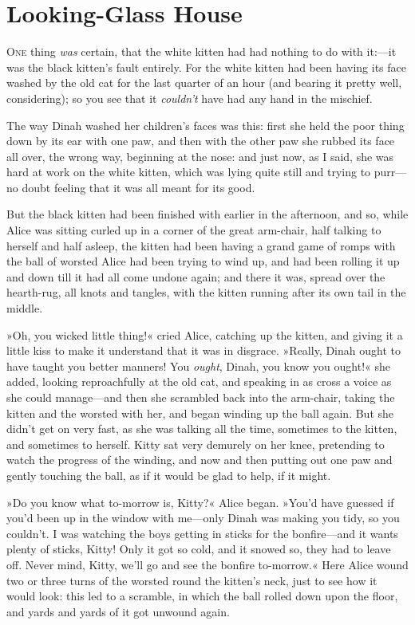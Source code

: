 \chapter{Looking-Glass House}

\lettrine[lines=4]{O}{ne} thing \textit{was} certain, that the white kitten had had nothing to do with it:—it was the black kitten's fault entirely. For the white kitten had been having its face washed by the old cat for the last quarter of an hour (and bearing it pretty well, considering); so you see that it \textit{couldn't} have had any hand in the mischief.

The way Dinah washed her children's faces was this: first she held the poor thing down by its ear with one paw, and then with the other paw she rubbed its face all over, the wrong way, beginning at the nose: and just now, as I said, she was hard at work on the white kitten, which was lying quite still and trying to purr—no doubt feeling that it was all meant for its good.

But the black kitten had been finished with earlier in the afternoon, and so, while Alice was sitting curled up in a corner of the great arm-chair, half talking to herself and half asleep, the kitten had been having a grand game of romps with the ball of worsted Alice had been trying to wind up, and had been rolling it up and down till it had all come undone again; and there it was, spread over the hearth-rug, all knots and tangles, with the kitten running after its own tail in the middle.

»Oh, you wicked little thing!« cried Alice, catching up the kitten, and giving it a little kiss to make it understand that it was in disgrace. »Really, Dinah ought to have taught you better manners! You \textit{ought}, Dinah, you know you ought!« she added, looking reproachfully at the old cat, and speaking in as cross a voice as she could manage—and then she scrambled back into the arm-chair, taking the kitten and the worsted with her, and began winding up the ball again. But she didn't get on very fast, as she was talking all the time, sometimes to the kitten, and sometimes to herself. Kitty sat very demurely on her knee, pretending to watch the progress of the winding, and now and then putting out one paw and gently touching the ball, as if it would be glad to help, if it might.

»Do you know what to-morrow is, Kitty?« Alice began. »You'd have guessed if you'd been up in the window with me—only Dinah was making you tidy, so you couldn't. I was watching the boys getting in sticks for the bonfire—and it wants plenty of sticks, Kitty! Only it got so cold, and it snowed so, they had to leave off. Never mind, Kitty, we'll go and see the bonfire to-morrow.« Here Alice wound two or three turns of the worsted round the kitten's neck, just to see how it would look: this led to a scramble, in which the ball rolled down upon the floor, and yards and yards of it got unwound again.

